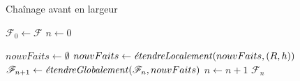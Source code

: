 \begin{algorithm}[H]\label{algo:chainage_avant_largeur}
\caption{Chaînage avant en largeur}
\SetAlgoLined
\DontPrintSemicolon


$\mathcal{F}_0 \gets \mathcal{F}$\;
$n \gets 0$\;

{
    $nouvFaits\gets \emptyset$ \;
    {
        {
            {
                $nouvFaits \leftarrow \mbox{\textit{étendreLocalement}}(nouvFaits, (R,h))$\;
            }
        }
    }
    $\mathcal{F}_{n+1} \gets \mbox{\textit{étendreGlobalement}}(\mathcal{F}_{n}, nouvFaits)$\;
    $n \gets n + 1$\;
}
\Return $\mathcal{F}_n$
\end{algorithm}





